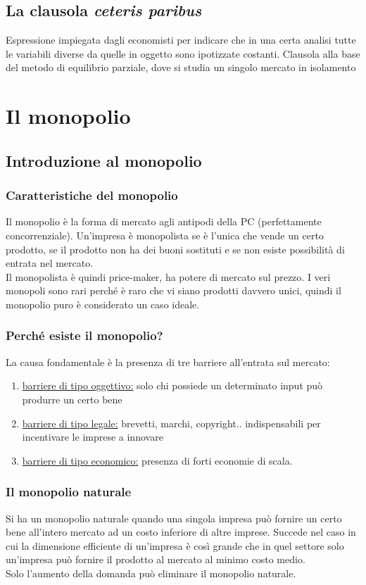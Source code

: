 \documentclass{report}
\begin{document}
	\section{La clausola \textit{ceteris paribus}}
	Espressione impiegata dagli economisti per indicare che in una certa analisi tutte le variabili diverse da quelle in oggetto sono ipotizzate costanti. Clausola alla base del metodo di equilibrio parziale, dove si studia un singolo mercato in isolamento
	
	\chapter{Il monopolio}
	\section{Introduzione al monopolio}
	\subsection{Caratteristiche del monopolio}
	Il monopolio è la forma di mercato agli antipodi della PC (perfettamente concorrenziale). Un'impresa è monopolista se è l'unica che vende un certo prodotto, se il prodotto non ha dei buoni sostituti e se non esiste possibilità di entrata nel mercato.
	\medskip \\Il monopolista è quindi price-maker, ha potere di mercato sul prezzo. I veri monopoli sono rari perché è raro che vi siano prodotti davvero unici, quindi il monopolio puro è considerato un caso ideale.
	\subsection{Perché esiste il monopolio?}
	La causa fondamentale è la presenza di tre barriere all'entrata sul mercato:
	\begin{enumerate}
		\item \underline{barriere di tipo oggettivo:} solo chi possiede un determinato input può produrre un certo bene
		\item \underline{barriere di tipo legale:} brevetti, marchi, copyright.. indispensabili per incentivare le imprese a innovare
		\item \underline{barriere di tipo economico:} presenza di forti economie di scala.
	\end{enumerate}
	\subsection{Il monopolio naturale}
	Si ha un monopolio naturale quando una singola impresa può fornire un certo bene all'intero mercato ad un costo inferiore di altre imprese. Succede nel caso in cui la dimensione efficiente di un'impresa è così grande che in quel settore solo un'impresa può fornire il prodotto al mercato al minimo costo medio.
	\medskip \\Solo l'aumento della domanda può eliminare il monopolio naturale.
\end{document}
